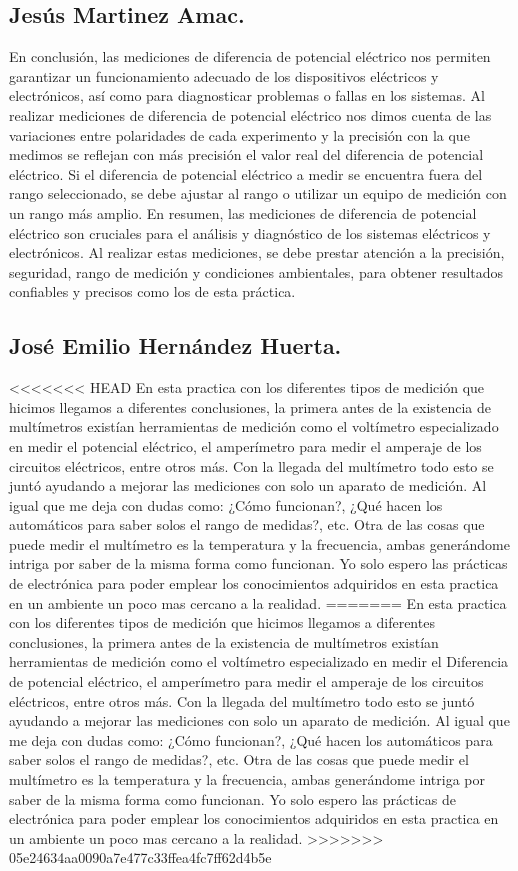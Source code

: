 \documentclass[10pt]{article}
\begin{document}
\begin{multicols}{2}
\subsection*{Jesús Martinez Amac.}
En conclusión, las mediciones de diferencia de potencial eléctrico nos permiten garantizar un funcionamiento adecuado de los dispositivos eléctricos y electrónicos, así como para diagnosticar problemas o fallas en los sistemas.
Al realizar mediciones de diferencia de potencial eléctrico nos dimos cuenta de las variaciones entre polaridades de cada experimento y la precisión con la que medimos se reflejan con más precisión el valor real del diferencia de potencial eléctrico.
 Si el diferencia de potencial eléctrico a medir se encuentra fuera del rango seleccionado, se debe ajustar al rango o utilizar un equipo de medición con un rango más amplio.
En resumen, las mediciones de diferencia de potencial eléctrico son cruciales para el análisis y diagnóstico de los sistemas eléctricos y electrónicos. Al realizar estas mediciones, se debe prestar atención a la precisión, seguridad, rango de medición y condiciones ambientales, para obtener resultados confiables y precisos como los de esta práctica.
\subsection*{José Emilio Hernández Huerta.}
<<<<<<< HEAD
En esta practica con los diferentes tipos de medición que hicimos llegamos a diferentes conclusiones, la primera antes de la existencia de multímetros existían herramientas de medición como el voltímetro especializado en medir el potencial eléctrico, el amperímetro para medir el amperaje de los circuitos eléctricos, entre otros más. Con la llegada del multímetro todo esto se juntó ayudando a mejorar las mediciones con solo un aparato de medición. Al igual que me deja con dudas como: ¿Cómo funcionan?, ¿Qué hacen los automáticos para saber solos el rango de medidas?, etc. Otra de las cosas que puede medir el multímetro es la temperatura y la frecuencia, ambas generándome intriga por saber de la misma forma como funcionan. Yo solo espero las prácticas de electrónica para poder emplear los conocimientos adquiridos en esta practica en un ambiente un poco mas cercano a la realidad. 
=======
En esta practica con los diferentes tipos de medición que hicimos llegamos a diferentes conclusiones, la primera antes de la existencia de multímetros existían herramientas de medición como el voltímetro especializado en medir el Diferencia de potencial eléctrico, el amperímetro para medir el amperaje de los circuitos eléctricos, entre otros más. Con la llegada del multímetro todo esto se juntó ayudando a mejorar las mediciones con solo un aparato de medición. Al igual que me deja con dudas como: ¿Cómo funcionan?, ¿Qué hacen los automáticos para saber solos el rango de medidas?, etc. Otra de las cosas que puede medir el multímetro es la temperatura y la frecuencia, ambas generándome intriga por saber de la misma forma como funcionan. Yo solo espero las prácticas de electrónica para poder emplear los conocimientos adquiridos en esta practica en un ambiente un poco mas cercano a la realidad. 
>>>>>>> 05e24634aa0090a7e477c33ffea4fc7ff62d4b5e

\end{multicols}
\end{document}
